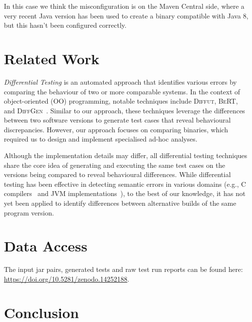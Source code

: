 \documentclass[conference]{IEEEtran}
\begin{document}
In this case we think the misconfiguration is on the Maven Central side, where a very recent Java version has been used to create a binary compatible with Java 8, but this hasn't been configured correctly.





\section{Related Work}
\label{sec:relatedwork}

\emph{Differential Testing}\cite{difftesting} is an automated approach that identifies various errors by comparing the behaviour of two or more comparable systems\cite{xie2007towards,jin10:automated,diffgen}. In the context of object-oriented (OO) programming, notable techniques include \textsc{Diffut}\cite{xie2007towards}, \textsc{BeRT}\cite{jin10:automated}, and \textsc{DiffGen}~\cite{diffgen}. Similar to our approach, these techniques leverage the differences between two software versions to generate test cases that reveal behavioural discrepancies. However, our approach focuses on comparing binaries, which required us to design and implement specialised ad-hoc analyses.

Although the implementation details may differ, all differential testing techniques share the core idea of generating and executing the same test cases on the versions being compared to reveal behavioural differences. %
While differential testing has been effective in detecting semantic errors in various domains (e.g., C compilers~\cite{Yang:compiler:pldi:2011} and JVM implementations~\cite{Chen:jvmdiff:pldi:2016}), to the best of our knowledge, it has not yet been applied to identify differences between alternative builds of the same program version.


\section{Data Access}
\label{sec:dataaccess}

The input jar pairs, generated tests and raw test run reports can be found here: \url{https://doi.org/10.5281/zenodo.14252188}.


\section{Conclusion}
\label{sec:conclusion}
\end{document}
